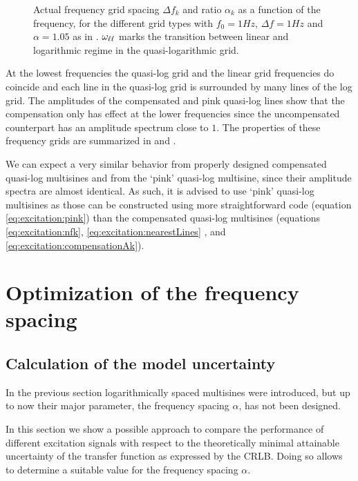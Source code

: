   \begin{figure}
    \centering
    \setlength{}
    \setlength\figureheight{0.68\figurewidth}
    
    \caption[Actual frequency grid spacing and ratio for different grids]{Actual frequency grid spacing $\Delta f_k$ and ratio $\alpha_k$ as a function of the frequency, for the different grid types with $f_0 =1\unit{Hz}$, $\Delta f = 1\unit{Hz}$ and $\alpha =1.05$ as in . $\omega_{\ell \ell}$ marks the transition between linear and logarithmic regime in the quasi-logarithmic grid.}
    \label{fig:excitation:gridPropertyPlots}
  \end{figure}

  At the lowest frequencies the quasi-log grid and the linear grid frequencies do coincide and each line in the quasi-log grid is surrounded by many lines of the log grid.
  The amplitudes of the compensated and pink quasi-log lines show that the compensation only has effect at the lower frequencies since the uncompensated counterpart has an amplitude spectrum close to $1$.
  The properties of these frequency grids are summarized in  and .

  We can expect a very similar behavior from properly designed compensated quasi-log multisines and from the `pink' quasi-log multisine, since their amplitude spectra are almost identical.
  As such, it is advised to use `pink' quasi-log multisines as those can be constructed using more straightforward code (equation \eqref{eq:excitation:pink}) than the compensated quasi-log multisines (equations \eqref{eq:excitation:nfk}, \eqref{eq:excitation:nearestLines} , and \eqref{eq:excitation:compensationAk}).

\section{Optimization of the frequency spacing} 
\label{sec:excitation:optimAlpha}
  \subsection{Calculation of the model uncertainty}
  In the previous section logarithmically spaced multisines were introduced, but up to now their major parameter, the frequency spacing $\alpha$, has not been designed.

  In this section we show a possible approach to compare the performance of different excitation signals with respect to the theoretically minimal attainable uncertainty of the transfer function as expressed by the \gls{CRLB}.
  Doing so allows to determine a suitable value for the frequency spacing $\alpha$.

